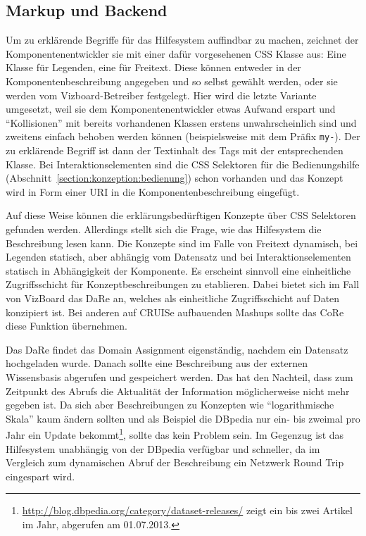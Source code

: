 \documentclass[
	headsepline,
	footsepline,
	fontsize=12pt,
	bibliography=totoc
]{scrbook}
\begin{document}
\subsection{Markup und Backend}
\label{section:konzeption:verlinkung:backend}

Um zu erklärende Begriffe für das Hilfesystem auffindbar zu machen, zeichnet der Komponentenentwickler sie mit einer dafür vorgesehenen CSS Klasse aus: Eine Klasse für Legenden, eine für Freitext. Diese können entweder in der Komponentenbeschreibung angegeben und so selbst gewählt werden, oder sie werden vom Vizboard-Betreiber festgelegt. Hier wird die letzte Variante umgesetzt, weil sie dem Komponentenentwickler etwas Aufwand erspart und \enquote{Kollisionen} mit bereits vorhandenen Klassen erstens unwahrscheinlich sind und zweitens einfach behoben werden können (beispielsweise mit dem Präfix \texttt{my-}). Der zu erklärende Begriff ist dann der Textinhalt des Tags mit der entsprechenden Klasse. Bei Interaktionselementen sind die CSS Selektoren für die Bedienungshilfe (Abschnitt~\ref{section:konzeption:bedienung}) schon vorhanden und das Konzept wird in Form einer URI in die Komponentenbeschreibung eingefügt.

Auf diese Weise können die erklärungsbedürftigen Konzepte über CSS Selektoren gefunden werden. Allerdings stellt sich die Frage, wie das Hilfesystem die Beschreibung lesen kann. Die Konzepte sind im Falle von Freitext dynamisch, bei Legenden statisch, aber abhängig vom Datensatz und bei Interaktionselementen statisch in Abhängigkeit der Komponente. Es erscheint sinnvoll eine einheitliche Zugriffsschicht für Konzeptbeschreibungen zu etablieren. Dabei bietet sich im Fall von VizBoard das DaRe an, welches als einheitliche Zugriffsschicht auf Daten konzipiert ist. Bei anderen auf CRUISe aufbauenden Mashups sollte das CoRe diese Funktion übernehmen.

Das DaRe findet das Domain Assignment eigenständig, nachdem ein Datensatz hochgeladen wurde. Danach sollte eine Beschreibung aus der externen Wissensbasis abgerufen und gespeichert werden. Das hat den Nachteil, dass zum Zeitpunkt des Abrufs die Aktualität der Information möglicherweise nicht mehr gegeben ist. Da sich aber Beschreibungen zu Konzepten wie \enquote{logarithmische Skala} kaum ändern sollten und als Beispiel die DBpedia nur ein- bis zweimal pro Jahr ein Update bekommt\footnote{\url{http://blog.dbpedia.org/category/dataset-releases/} zeigt ein bis zwei Artikel im Jahr, abgerufen am 01.07.2013.}, sollte das kein Problem sein. Im Gegenzug ist das Hilfesystem unabhängig von der DBpedia verfügbar und schneller, da im Vergleich zum dynamischen Abruf der Beschreibung ein Netzwerk Round Trip eingespart wird.
\end{document}
